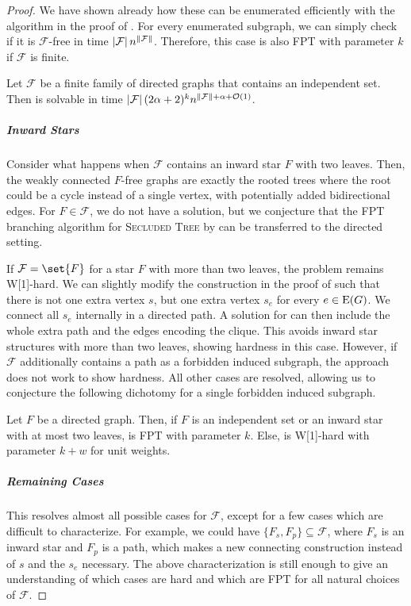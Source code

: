 \begin{proof}
We have shown already how these can be enumerated efficiently with the algorithm in the proof of . For every enumerated subgraph, we can simply check if it is $\mathcal{F}$-free in time $\abs{\mathcal{F}}n^{\|\mathcal{F}\|}$. Therefore, this case is also FPT with parameter $k$ if $\mathcal{F}$ is finite. 
\begin{theorem}
  Let $\mathcal{F}$ be a finite family of directed graphs that contains an independent set. Then \prob{} is solvable in time $\abs{\mathcal{F}}(2\alpha + 2)^kn^{\|\mathcal{F}\| + \alpha + \bigO{1}}$.
\end{theorem}

\subparagraph*{Inward Stars}
Consider what happens when $\mathcal{F}$ contains an inward star $F$ with two leaves. Then, the weakly connected $F$-free graphs are exactly the rooted trees where the root could be a cycle instead of a single vertex, with potentially added bidirectional edges. For $F \in \mathcal{F}$, we do not have a solution, but we conjecture that the FPT branching algorithm for \textsc{Secluded Tree} by \cite{donkers2023finding} can be transferred to the directed setting. 

If $\mathcal{F} = \set{F}$ for a star $F$ with more than two leaves, the problem remains W[1]-hard. We can slightly modify the construction in the proof of  such that there is not one extra vertex $s$, but one extra vertex $s_e$ for every $e \in \operatorname{E}({G})$. We connect all $s_e$ internally in a directed path. A solution for \prob{} can then include the whole extra path and the edges encoding the clique. This avoids inward star structures with more than two leaves, showing hardness in this case. However, if $\mathcal{F}$ additionally contains a path as a forbidden induced subgraph, the approach does not work to show hardness. All other cases are resolved, allowing us to conjecture the following dichotomy for a single forbidden induced subgraph.
\begin{conjecture}
  Let $F$ be a directed graph. Then, if $F$ is an independent set or an inward star with at most two leaves, \prob{} is FPT with parameter $k$. Else, \prob{} is W[1]-hard with parameter $k + w$ for unit weights.
\end{conjecture}

\subparagraph*{Remaining Cases}
This resolves almost all possible cases for $\mathcal{F}$, except for a few cases which are difficult to characterize. For example, we could have $\{F_s, F_p\} \subseteq \mathcal{F} $, where $F_s$ is an inward star and $F_p$ is a path, which makes a new connecting construction instead of $s$ and the $s_e$ necessary. The above characterization is still enough to give an understanding of which cases are hard and which are FPT for all natural choices of $\mathcal{F}$. 


\end{proof}
